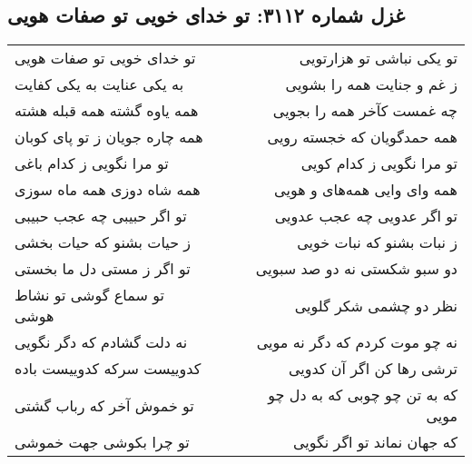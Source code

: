 \begin{center}
\section*{غزل شماره ۳۱۱۲: تو خدای خویی تو صفات هویی}
\label{sec:3112}
\begin{longtable}{l p{0.5cm} r}
تو خدای خویی تو صفات هویی
&&
تو یکی نباشی تو هزارتویی
\\
به یکی عنایت به یکی کفایت
&&
ز غم و جنایت همه را بشویی
\\
همه یاوه گشته همه قبله هشته
&&
چه غمست کآخر همه را بجویی
\\
همه چاره جویان ز تو پای کوبان
&&
همه حمدگویان که خجسته رویی
\\
تو مرا نگویی ز کدام باغی
&&
تو مرا نگویی ز کدام کویی
\\
همه شاه دوزی همه ماه سوزی
&&
همه وای وایی همه‌های و هویی
\\
تو اگر حبیبی چه عجب حبیبی
&&
تو اگر عدویی چه عجب عدویی
\\
ز حیات بشنو که حیات بخشی
&&
ز نبات بشنو که نبات خویی
\\
تو اگر ز مستی دل ما بخستی
&&
دو سبو شکستی نه دو صد سبویی
\\
تو سماع گوشی تو نشاط هوشی
&&
نظر دو چشمی شکر گلویی
\\
نه دلت گشادم که دگر نگویی
&&
نه چو موت کردم که دگر نه مویی
\\
کدوییست سرکه کدوییست باده
&&
ترشی رها کن اگر آن کدویی
\\
تو خموش آخر که رباب گشتی
&&
که به تن چو چوبی که به دل چو مویی
\\
تو چرا بکوشی جهت خموشی
&&
که جهان نماند تو اگر نگویی
\\
\end{longtable}
\end{center}
